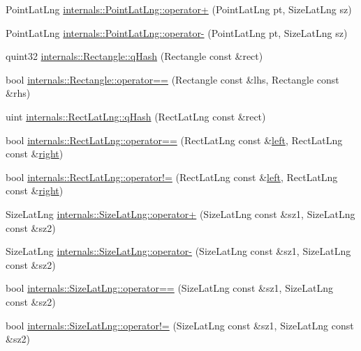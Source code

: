 \begin{DoxyCompactItemize}
\item 
Point\-Lat\-Lng \hyperlink{group___o_p_map_widget_ga488020cfd021f98e4856f128d9448367}{internals\-::\-Point\-Lat\-Lng\-::operator+} (Point\-Lat\-Lng pt, Size\-Lat\-Lng sz)
\item 
Point\-Lat\-Lng \hyperlink{group___o_p_map_widget_ga7af0e8545fa560e7264f0c7cedae458b}{internals\-::\-Point\-Lat\-Lng\-::operator-\/} (Point\-Lat\-Lng pt, Size\-Lat\-Lng sz)
\item 
quint32 \hyperlink{group___o_p_map_widget_ga147a59b523f242e2fe2549b016688b2c}{internals\-::\-Rectangle\-::q\-Hash} (Rectangle const \&rect)
\item 
bool \hyperlink{group___o_p_map_widget_ga49a8cb6dd0aff741dcae36e54dedd8be}{internals\-::\-Rectangle\-::operator==} (Rectangle const \&lhs, Rectangle const \&rhs)
\item 
uint \hyperlink{group___o_p_map_widget_ga67b89136c8dd499f5081ea9c95aeed4b}{internals\-::\-Rect\-Lat\-Lng\-::q\-Hash} (Rect\-Lat\-Lng const \&rect)
\item 
bool \hyperlink{group___o_p_map_widget_ga1a6afef3d18a3e0a340d1d9dfe632a6a}{internals\-::\-Rect\-Lat\-Lng\-::operator==} (Rect\-Lat\-Lng const \&\hyperlink{glext_8h_a85b8f6c07fbc1fb5d77c2ae090f21995}{left}, Rect\-Lat\-Lng const \&\hyperlink{glext_8h_a5ffadbbacc6b89cf6218bc43b384d3fe}{right})
\item 
bool \hyperlink{group___o_p_map_widget_ga3259b80d8473418ef75be3a72b243e2a}{internals\-::\-Rect\-Lat\-Lng\-::operator!=} (Rect\-Lat\-Lng const \&\hyperlink{glext_8h_a85b8f6c07fbc1fb5d77c2ae090f21995}{left}, Rect\-Lat\-Lng const \&\hyperlink{glext_8h_a5ffadbbacc6b89cf6218bc43b384d3fe}{right})
\item 
Size\-Lat\-Lng \hyperlink{group___o_p_map_widget_ga398e0bae9b1c31e141e49ea14f960ad3}{internals\-::\-Size\-Lat\-Lng\-::operator+} (Size\-Lat\-Lng const \&sz1, Size\-Lat\-Lng const \&sz2)
\item 
Size\-Lat\-Lng \hyperlink{group___o_p_map_widget_ga5d0f63cfc6ce4e2c3249697e3156df5e}{internals\-::\-Size\-Lat\-Lng\-::operator-\/} (Size\-Lat\-Lng const \&sz1, Size\-Lat\-Lng const \&sz2)
\item 
bool \hyperlink{group___o_p_map_widget_gabb95545e93acc311be149febe7752b80}{internals\-::\-Size\-Lat\-Lng\-::operator==} (Size\-Lat\-Lng const \&sz1, Size\-Lat\-Lng const \&sz2)
\item 
bool \hyperlink{group___o_p_map_widget_ga1ee10c15dd9b86cfaf44a95b0bfd5bab}{internals\-::\-Size\-Lat\-Lng\-::operator!=} (Size\-Lat\-Lng const \&sz1, Size\-Lat\-Lng const \&sz2)
\end{DoxyCompactItemize}


